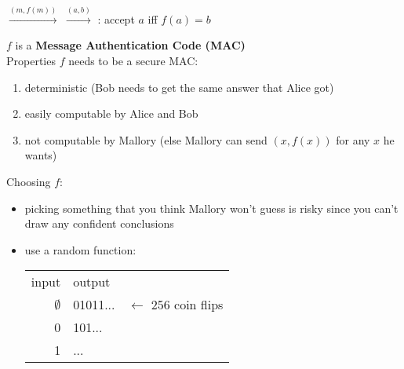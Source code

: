  $\xrightarrow{(m, f(m))}$
     $\xrightarrow{(a,b)}$
     : accept $a$ iff $f(a) = b$

$f$ is a {\bf Message Authentication Code (MAC)}\\

Properties $f$ needs to be a secure MAC:
\begin{enumerate}
    \item deterministic (Bob needs to get the same answer that Alice got)
    \item easily computable by Alice and Bob
    \item not computable by Mallory (else Mallory can send $(x, f(x))$ for any
        $x$ he wants)
\end{enumerate}

Choosing $f$:
\begin{itemize}
    \item picking something that you think Mallory won't guess is risky since
        you can't draw any confident conclusions
    \item use a random function:
        \begin{table}[!h]\centering\begin{tabular}{r|ll}
            input & output &\\
            \cline{1-2}
            $\emptyset$ & 01011... & $\leftarrow$ 256 coin flips\\
            0 & 101... &\\
            1 & ... &\\
        \end{tabular}\end{table}

\end{itemize}
